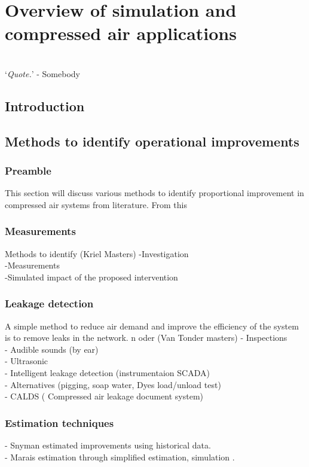 \chapter{Overview of simulation and compressed air applications}
\thispagestyle{empty}
\vspace{38em}
\hrulefill
\\
\enquote*{\textit{Quote.}} - Somebody\\
\newpage
\section{Introduction}
\section{Methods to identify operational improvements}
	\subsection{Preamble}
	This section will discuss various methods to identify proportional improvement in compressed air systems from literature. From this
	
	\subsection{Measurements}	
	Methods to identify 
	(Kriel Masters)
	-Investigation\\
	-Measurements\\
	-Simulated impact of the proposed intervention\\
	\subsection{Leakage detection}
	A simple method to reduce air demand and improve the efficiency of the system is to remove leaks in the network. n oder
		(Van Tonder masters)
		- Inspections\\
		- Audible sounds (by ear)\\
		- Ultrasonic\\
		- Intelligent leakage detection (instrumentaion SCADA)\\
		- Alternatives (pigging, soap water, Dyes load/unload test)\\
		-  CALDS ( Compressed air leakage document system)\\
	\subsection{Estimation techniques}
		- Snyman estimated improvements using historical data.\cite{Snyman2011Masters}\\
		- Marais estimation through simplified estimation, simulation \cite{Marais2012PhD, marais2013simplification}.
